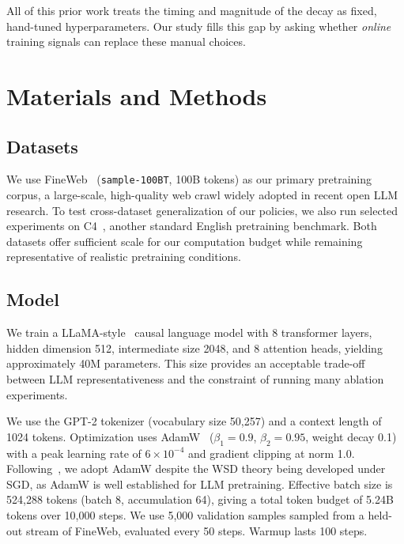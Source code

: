 \documentclass[10pt,conference,compsocconf]{IEEEtran}
\begin{document}
All of this prior work treats the timing and magnitude of the decay as fixed,
hand-tuned hyperparameters. Our study fills this gap by asking whether
\emph{online} training signals can replace these manual choices.


\section{Materials and Methods}

\subsection{Datasets}

We use FineWeb~\cite{penedo2024fineweb} (\texttt{sample-100BT}, 100B tokens)
as our primary pretraining corpus, a large-scale, high-quality web crawl widely
adopted in recent open LLM research. To test cross-dataset generalization of our
policies, we also run selected experiments on
C4~\cite{raffel2020c4}, another standard English pretraining benchmark.
Both datasets offer sufficient scale for our computation budget while remaining
representative of realistic pretraining conditions.

\subsection{Model}

We train a LLaMA-style~\cite{dubey2024llama3} causal language model with 8
transformer layers, hidden dimension 512, intermediate size 2048, and 8
attention heads, yielding approximately 40M parameters. This size provides an
acceptable trade-off between LLM representativeness and the constraint of
running many ablation experiments.

We use the GPT-2 tokenizer (vocabulary size 50,257) and a context length of
1024 tokens. Optimization uses AdamW~\cite{loshchilov2019adamw} ($\beta_1 =
0.9$, $\beta_2 = 0.95$, weight decay 0.1) with a peak learning rate of $6
\times 10^{-4}$ and gradient clipping at norm 1.0. Following~\citet{wen2024river},
we adopt AdamW despite the WSD theory being developed under SGD, as AdamW
is well established for LLM pretraining. Effective batch size is 524,288 tokens
(batch 8, accumulation 64), giving a total token budget of 5.24B tokens over
10,000 steps. We use 5,000 validation samples sampled from a held-out stream of
FineWeb, evaluated every 50 steps. Warmup lasts 100 steps.
\end{document}
